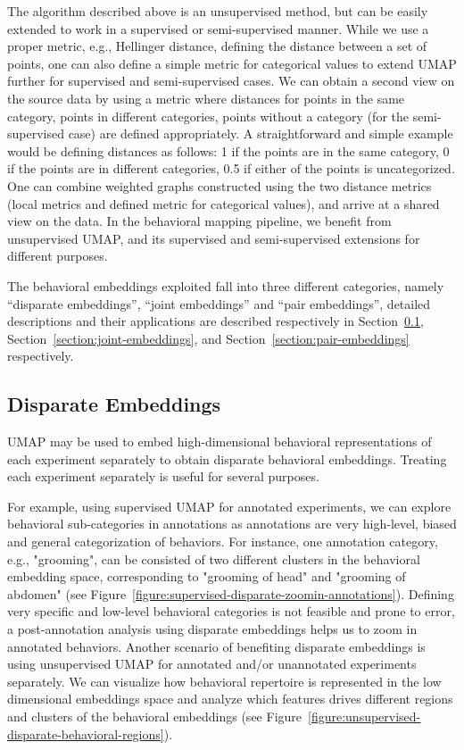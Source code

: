 The algorithm described above is an unsupervised method, but can be easily extended to work in a supervised or semi-supervised manner.
While we use a proper metric, e.g., Hellinger distance, defining the distance between a set of points, one can also define a simple metric for categorical values to extend UMAP further for supervised and semi-supervised cases.
We can obtain a second view on the source data by using a metric where distances for points in the same category, points in different categories, points without a category (for the semi-supervised case) are defined appropriately.
A straightforward and simple example would be defining distances as follows: 1 if the points are in the same category, 0 if the points are in different categories, 0.5 if either of the points is uncategorized.
One can combine weighted graphs constructed using the two distance metrics (local metrics and defined metric for categorical values), and arrive at a shared view on the data.
In the behavioral mapping pipeline, we benefit from unsupervised UMAP, and its supervised and semi-supervised extensions for different purposes.

The behavioral embeddings exploited fall into three different categories, namely ``disparate embeddings'', ``joint embeddings'' and ``pair embeddings'', detailed descriptions and their applications are described respectively in  Section~\ref{section:disparate-embeddings}, Section~\ref{section:joint-embeddings}, and  Section~\ref{section:pair-embeddings} respectively.

\subsection{Disparate Embeddings}\label{section:disparate-embeddings}
UMAP may be used to embed high-dimensional behavioral representations of each experiment separately to obtain disparate behavioral embeddings. Treating each experiment separately is useful for several purposes.

For example, using supervised UMAP for annotated experiments, we can explore behavioral sub-categories in annotations as annotations are very high-level, biased and general categorization of behaviors. For instance, one annotation category, e.g., "grooming", can be consisted of two different clusters in the behavioral embedding space, corresponding to "grooming of head" and "grooming of abdomen" (see Figure~\ref{figure:supervised-disparate-zoomin-annotations}).
Defining very specific and low-level behavioral categories is not feasible and prone to error, a post-annotation analysis using disparate embeddings helps us to zoom in annotated behaviors.
Another scenario of benefiting disparate embeddings is using unsupervised UMAP for annotated and/or unannotated experiments separately.
We can visualize how behavioral repertoire is represented in the low dimensional embeddings space and analyze which features drives different regions and clusters of the behavioral embeddings (see Figure~\ref{figure:unsupervised-disparate-behavioral-regions}).

